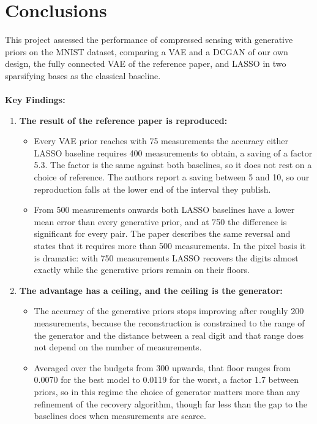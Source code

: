 \section{Conclusions}
\vspace{1cm}
This project assessed the performance of compressed sensing with generative priors on the MNIST dataset, comparing a VAE and a DCGAN of our own design, the fully connected VAE of the reference paper, and LASSO in two sparsifying bases as the classical baseline.
\\\\
\textbf{Key Findings:}

\begin{enumerate}
    \item \textbf{The result of the reference paper is reproduced:}
    \begin{itemize}
        \item Every VAE prior reaches with 75 measurements the accuracy either LASSO baseline requires 400 measurements to obtain, a saving of a factor 5.3. The factor is the same against both baselines, so it does not rest on a choice of reference. The authors report a saving between 5 and 10, so our reproduction falls at the lower end of the interval they publish.
        \item From 500 measurements onwards both LASSO baselines have a lower mean error than every generative prior, and at 750 the difference is significant for every pair. The paper describes the same reversal and states that it requires more than 500 measurements. In the pixel basis it is dramatic: with 750 measurements LASSO recovers the digits almost exactly while the generative priors remain on their floors.
    \end{itemize}
    \item \textbf{The advantage has a ceiling, and the ceiling is the generator:}
    \begin{itemize}
        \item The accuracy of the generative priors stops improving after roughly 200 measurements, because the reconstruction is constrained to the range of the generator and the distance between a real digit and that range does not depend on the number of measurements.
        \item Averaged over the budgets from 300 upwards, that floor ranges from 0.0070 for the best model to 0.0119 for the worst, a factor 1.7 between priors, so in this regime the choice of generator matters more than any refinement of the recovery algorithm, though far less than the gap to the baselines does when measurements are scarce.

\end{itemize}
\end{enumerate}

